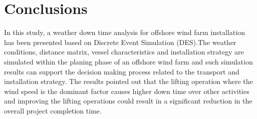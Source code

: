 \section{Conclusions}
In this study, a weather down time analysis for offshore wind farm installation  has been presented based on Discrete Event Simulation (DES).The weather conditions, distance matrix, vessel characteristics and installation strategy are simulated within the planing phase of an offshore wind farm and such simulation results can support the decision making process related to the transport and installation strategy. The results pointed out that the lifting operation where the wind speed is the dominant factor causes higher down time over other activities and improving the lifting operations could result in a significant reduction in the overall project completion time. 
